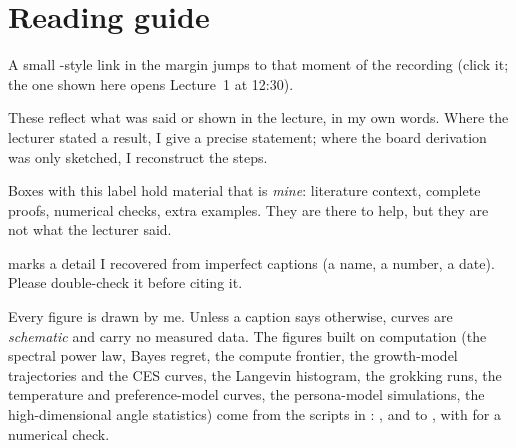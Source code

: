 \section*{Reading guide}
\begin{description}[style=nextline, leftmargin=1.2em, itemsep=0.55em]
  \item[Margin timestamps] A small -style link in the margin jumps to that moment of the recording (click it; the one shown here opens Lecture~1 at 12:30).
  \item[Plain text and the colored boxes] These reflect what was said or shown in the lecture, in my own words. Where the lecturer
    stated a result, I give a precise statement; where the board derivation was only sketched, I reconstruct the steps.
  \item[\textcolor{amber}{Beyond the lecture}\dagmark] Boxes with this label hold material that is \emph{mine}: literature context, complete proofs,
    numerical checks, extra examples. They are there to help, but they are not what the lecturer said.
  \item[\textcolor{crimson}{\ddag}] marks a detail I recovered from imperfect captions (a name, a number, a date). Please double-check it before
    citing it.
  \item[Figures] Every figure is drawn by me. Unless a caption says otherwise, curves are \emph{schematic} and carry no measured data. The
    figures built on computation (the spectral power law, Bayes regret, the compute frontier, the growth-model trajectories and the CES curves, the Langevin histogram, the grokking runs, the temperature and preference-model curves, the persona-model simulations, the high-dimensional angle statistics) come from the scripts in : ,  and  to , with  for a numerical check.
\end{description}

